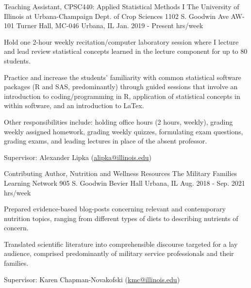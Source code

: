 \begin{cventries}


  \cventry
    {Teaching Assistant, CPSC440: Applied Statistical Methods I} %
    {The University of Illinois at Urbana-Champaign \newline Dept. of Crop Sciences } %
    {1102 S. Goodwin Ave \newline AW-101 Turner Hall, MC-046 \newline
    Urbana, IL} %
    {Jan. 2019 - Present  hrs/week} %
    {
      \begin{cvitems} %
        \item {Hold one 2-hour weekly recitation/computer laboratory session where I lecture and lead review statistical concepts learned in the lecture component for up to 80 students.}
        \item {Practice and increase the students’ familiarity with common statistical software packages (R and SAS, predominantly) through guided sessions that involve an introduction to coding/programming in R, application of statistical concepts in within software, and an introduction to LaTex.}
        \item {Other responsibilities include: holding office hours (2 hours, weekly), grading weekly assigned homework, grading weekly quizzes, formulating exam questions, grading exams, and leading lectures in place of the absent professor.}
        \item {Supervisor: Alexander Lipka (\textcolor{navyblue}{\underline{\href{mailto:alipka@illinois.edu}{alipka@illinois.edu}}})}
      \end{cvitems}
    }



  \cventry
    {Contributing Author, Nutrition and Wellness Resources } %
    {The Military Families Learning Network } %
    {905 S. Goodwin  Bevier Hall \newline
    Urbana, IL} %
    {Aug. 2018 - Sep. 2021  hrs/week} %
    {
      \begin{cvitems} %
        \item {Prepared evidence-based blog-posts concerning relevant and contemporary nutrition topics, ranging from different types of diets to describing nutrients of concern.}
        \item {Translated scientific literature into comprehensible discourse targeted for a lay audience, comprised predominantly of military service professionals and their families.}
        \item {Supervisor: Karen Chapman-Novakofski (\textcolor{navyblue}{\underline{\href{mailto:kmc@illinois.edu}{kmc@illinois.edu}}})}
      \end{cvitems}
    }


\end{cventries}
